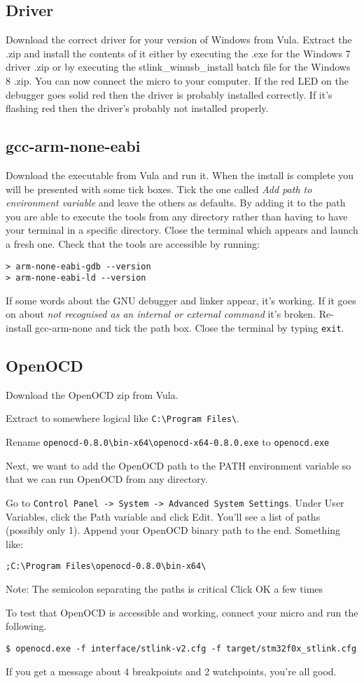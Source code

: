 \subsection{Driver}
Download the correct driver for your version of Windows from Vula. Extract the .zip and install the contents of it either by executing the .exe for the Windows 7 driver .zip or by executing the stlink\_winusb\_install batch file for the Windows 8 .zip.
You can now connect the micro to your computer. If the red LED on the debugger goes solid red then the driver is probably installed correctly. If it's flashing red then the driver's probably not installed properly. 

\subsection{gcc-arm-none-eabi}
Download the executable from Vula and run it. When the install is complete you will be presented with some tick boxes. Tick the one called \textit{Add path to environment variable} and leave the others as defaults. By adding it to the path you are able to execute the tools from any directory rather than having to have your terminal in a specific directory. 
Close the terminal which appears and launch a fresh one. Check that the tools are accessible by running:
\begin{lstlisting}[style=BashStyle]
> arm-none-eabi-gdb --version
> arm-none-eabi-ld --version
\end{lstlisting}
If some words about the GNU debugger and linker appear, it's working. 
If it goes on about \textit{not recognised as an internal or external command} it's broken. Re-install gcc-arm-none and tick the path box.
Close the terminal by typing \texttt{exit}.


\subsection{OpenOCD}
Download the OpenOCD zip from Vula. 

Extract to somewhere logical like \verb+C:\Program Files\+. 

Rename \verb+openocd-0.8.0\bin-x64\openocd-x64-0.8.0.exe+ to \verb+openocd.exe+

Next, we want to add the OpenOCD path to the PATH environment variable so that we can run OpenOCD from any directory.

Go to \verb+Control Panel -> System -> Advanced System Settings+. Under User Variables, click the Path variable and click Edit. You’ll see a list of paths (possibly only 1). Append your OpenOCD binary path to the end.
Something like:
\begin{verbatim}
;C:\Program Files\openocd-0.8.0\bin-x64\
\end{verbatim}
Note: The semicolon separating the paths is critical Click OK a few times 

To test that OpenOCD is accessible and working, connect your micro and run the following.
\begin{lstlisting}[style=BashStyle]
$ openocd.exe -f interface/stlink-v2.cfg -f target/stm32f0x_stlink.cfg
\end{lstlisting}
If you get a message about 4 breakpoints and 2 watchpoints, you're all good.

